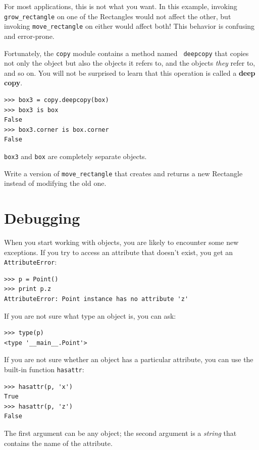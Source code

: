 \documentclass[10pt]{book}
\begin{document}
For most applications, this is not what you want.  In this example,
invoking \verb"grow_rectangle" on one of the Rectangles would not
affect the other, but invoking \verb"move_rectangle" on either would
affect both!  This behavior is confusing and error-prone.

Fortunately, the {\tt copy} module contains a method named {\tt
deepcopy} that copies not only the object but also 
the objects it refers to, and the objects {\em they} refer to,
and so on.
You will not be surprised to learn that this operation is
called a {\bf deep copy}.

\begin{verbatim}
>>> box3 = copy.deepcopy(box)
>>> box3 is box
False
>>> box3.corner is box.corner
False
\end{verbatim}
%
{\tt box3} and {\tt box} are completely separate objects.


\begin{exercise}

Write a version of \verb"move_rectangle" that creates and
returns a new Rectangle instead of modifying the old one.

\end{exercise}


\section{Debugging}
\label{hasattr}

When you start working with objects, you are likely to encounter
some new exceptions.  If you try to access an attribute
that doesn't exist, you get an {\tt AttributeError}:

\begin{verbatim}
>>> p = Point()
>>> print p.z
AttributeError: Point instance has no attribute 'z'
\end{verbatim}
%
If you are not sure what type an object is, you can ask:

\begin{verbatim}
>>> type(p)
<type '__main__.Point'>
\end{verbatim}
%
If you are not sure whether an object has a particular attribute,
you can use the built-in function {\tt hasattr}:

\begin{verbatim}
>>> hasattr(p, 'x')
True
>>> hasattr(p, 'z')
False
\end{verbatim}
%
The first argument can be any object; the second argument is a {\em
string} that contains the name of the attribute.
\end{document}
